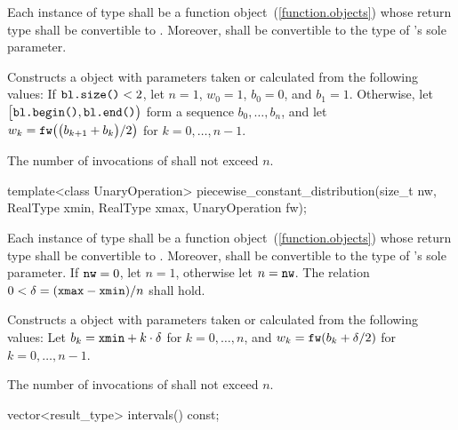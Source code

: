 \begin{itemdescr}
\pnum\requires
 Each instance of type 
 shall be a function object~(\ref{function.objects})
 whose return type shall be convertible to .
 Moreover,
  shall be convertible
 to the type of 's sole parameter.

\pnum\effects Constructs a  object
 with parameters taken or calculated
 from the following values:
 If $\texttt{\protect bl.size()} < 2$,
 let $n = 1$,
     $ w_0 = 1 $,
     $ b_0 = 0 $,
 and $ b_1 = 1 $.
 Otherwise,
 let $\bigl[\texttt{\protect bl.begin()}, \texttt{\protect bl.end()}\bigr)$
 form a sequence $ b_0, \ldots, b_n $,
 and
 let $ w_k = \texttt{\protect fw}\bigl(\bigl(b_{k+1} + b_k\bigr) / 2\bigr) $
 for $ k = 0, \ldots, n\!-\!1 $.

\pnum\complexity
 The number of invocations of  shall not exceed $n$.
\end{itemdescr}


%
\begin{itemdecl}
template<class UnaryOperation>
 piecewise_constant_distribution(size_t nw, RealType xmin, RealType xmax, UnaryOperation fw);
\end{itemdecl}

\begin{itemdescr}
\pnum\requires
 Each instance of type 
 shall be a function object~(\ref{function.objects})
 whose return type shall be convertible to .
 Moreover,
  shall be convertible
 to the type of 's sole parameter.
 If $ \texttt{\protect nw} = 0 $, let $ n = 1 $, otherwise let $n = \texttt{\protect nw}$.
 The relation $ 0 < \delta = (\texttt{\protect xmax} - \texttt{\protect xmin}) / n $
 shall hold.

\pnum\effects Constructs a  object
 with parameters taken or calculated
 from the following values:
 Let $ b_k = \texttt{\protect xmin} + k \cdot \delta $ for $ k = 0, \ldots, n $,
 and $ w_k = \texttt{\protect fw}(b_k + \delta / 2) $ for $ k = 0, \ldots, n\!-\!1 $.

\pnum\complexity
 The number of invocations of  shall not exceed $n$.
\end{itemdescr}

%
\begin{itemdecl}
vector<result_type> intervals() const;
\end{itemdecl}

